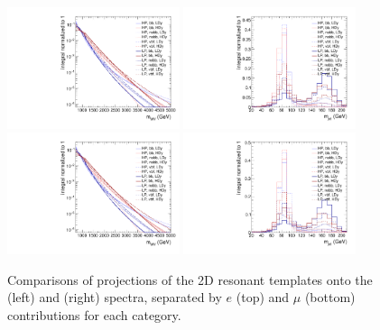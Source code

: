 \begin{figure}[htbp]
  \centering
  \includegraphics[width=0.45\textwidth]{fig/2Dfit/compTemplate_res_e_MVV_log.pdf}
  \includegraphics[width=0.45\textwidth]{fig/2Dfit/compTemplate_res_e_MJJ.pdf}\\
  \includegraphics[width=0.45\textwidth]{fig/2Dfit/compTemplate_res_mu_MVV_log.pdf}
  \includegraphics[width=0.45\textwidth]{fig/2Dfit/compTemplate_res_mu_MJJ.pdf}\\
  \caption{
    Comparisons of projections of the 2D resonant templates onto the \MVV (left) and \MJ (right) spectra, separated by $e$ (top) and $\mu$ (bottom) contributions for each category.
  }
  \label{fig:compTemplate_res}
\end{figure}
